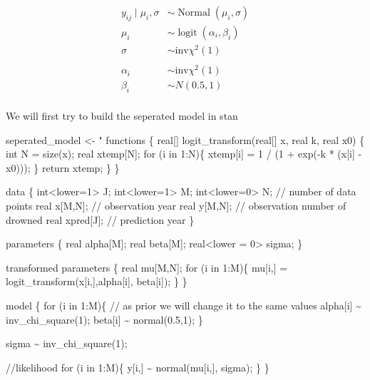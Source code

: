 \documentclass[
]{article}
\newenvironment{Shaded}{\begin{snugshade}}{\end{snugshade}}
\newcommand{\NormalTok}[1]{#1}
\newcommand{\OtherTok}[1]{\textcolor[rgb]{0.56,0.35,0.01}{#1}}
\newcommand{\StringTok}[1]{\textcolor[rgb]{0.31,0.60,0.02}{#1}}
\begin{document}
\[
\begin{aligned}
y_{i j} \mid \mu_i, \sigma &\sim \operatorname{Normal}\left(\mu_i, \sigma\right) \\
\mu_i &\sim \operatorname{logit}(\alpha_i, \beta_i)\\
\sigma &\sim \text{inv}\chi^2(1)\\
\\
\alpha_i &\sim \text{inv}\chi^2(1) \\
\beta_i &\sim N(0.5,1) \\
\end{aligned}
\]

We will first try to build the seperated model in stan

\begin{Shaded}
\begin{Highlighting}[]
\NormalTok{seperated\_model }\OtherTok{\textless{}{-}} \StringTok{"}
\StringTok{functions \{}
\StringTok{  real[] logit\_transform(real[] x, real k, real x0) \{}
\StringTok{    int N = size(x);}
\StringTok{    real xtemp[N];}
\StringTok{    for (i in 1:N)\{}
\StringTok{      xtemp[i] = 1 / (1 + exp({-}k * (x[i] {-} x0)));}
\StringTok{    \}}
\StringTok{     return xtemp;}
\StringTok{  \}}
\StringTok{\}}

\StringTok{data \{}
\StringTok{    int\textless{}lower=1\textgreater{} J;}
\StringTok{    int\textless{}lower=1\textgreater{} M;}
\StringTok{    int\textless{}lower=0\textgreater{} N; // number of data points}
\StringTok{    real x[M,N]; // observation year}
\StringTok{    real y[M,N]; // observation number of drowned}
\StringTok{    real xpred[J];  // prediction year}
\StringTok{\}}

\StringTok{parameters \{}
\StringTok{  real alpha[M];}
\StringTok{  real beta[M];}
\StringTok{  real\textless{}lower = 0\textgreater{} sigma;}
\StringTok{\}}

\StringTok{transformed parameters \{}
\StringTok{  real mu[M,N];}
\StringTok{  for (i in 1:M)\{}
\StringTok{    mu[i,] = logit\_transform(x[i,],alpha[i], beta[i]);}
\StringTok{  \}}
\StringTok{\}}

\StringTok{model \{}
\StringTok{  for (i in 1:M)\{}
\StringTok{    // as prior we will change it to the same values}
\StringTok{    alpha[i] \textasciitilde{} inv\_chi\_square(1);}
\StringTok{    beta[i] \textasciitilde{} normal(0.5,1);}
\StringTok{  \}}

\StringTok{  sigma \textasciitilde{} inv\_chi\_square(1);}

\StringTok{  //likelihood}
\StringTok{  for (i in 1:M)\{}
\StringTok{    y[i,] \textasciitilde{} normal(mu[i,], sigma);}
\StringTok{  \}}
\StringTok{\}}


\end{Highlighting}
\end{Shaded}
\end{document}

